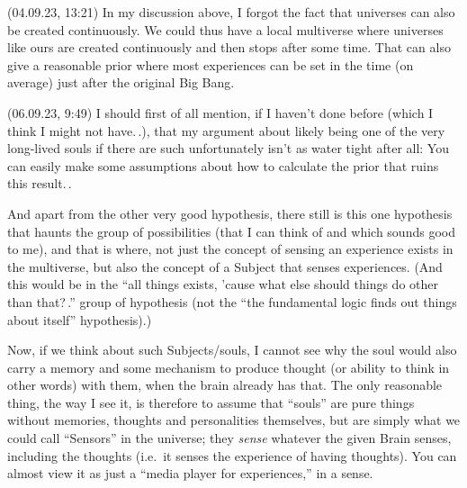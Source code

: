 \documentclass{report}
\begin{document}
(04.09.23, 13:21) In my discussion above, I forgot the fact that universes can also be created continuously. We could thus have a local multiverse where universes like ours are created continuously and then stops after some time. That can also give a reasonable prior where most experiences can be set in the time (on average) just after the original Big Bang.


(06.09.23, 9:49) I should first of all mention, if I haven't done before (which I think I might not have.\,.), that my argument about likely being one of the very long-lived souls if there are such unfortunately isn't as water tight after all: You can easily make some assumptions about how to calculate the prior that ruins this result.\,.

And apart from the other very good hypothesis, there still is this one hypothesis that haunts the group of possibilities (that I can think of and which sounds good to me), and that is where, not just the concept of sensing an experience exists in the multiverse, but also the concept of a Subject that senses experiences. (And this would be in the ``all things exists, 'cause what else should things do other than that?\,.'' group of hypothesis (not the ``the fundamental logic finds out things about itself'' hypothesis).)

Now, if we think about such Subjects/souls, I cannot see why the soul would also carry a memory and some mechanism to produce thought (or ability to think in other words) with them, when the brain already has that. The only reasonable thing, the way I see it, is therefore to assume that ``souls'' are pure things without memories, thoughts and personalities themselves, but are simply what we could call ``Sensors'' in the universe; they \emph{sense} whatever the given Brain senses, including the thoughts (i.e.\ it senses the experience of having thoughts). You can almost view it as just a ``media player for experiences,'' in a sense.
\end{document}
